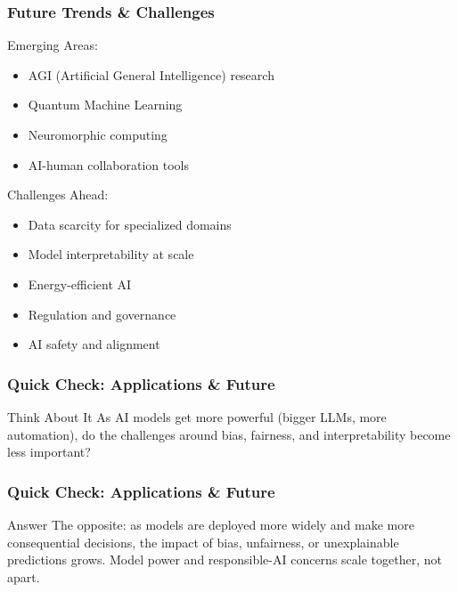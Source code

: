 \begin{frame}[fragile]\frametitle{Future Trends \& Challenges}
Emerging Areas:
\begin{itemize}
\item AGI (Artificial General Intelligence) research
\item Quantum Machine Learning
\item Neuromorphic computing
\item  AI-human collaboration tools
\end{itemize}

Challenges Ahead:
\begin{itemize}
\item Data scarcity for specialized domains
\item Model interpretability at scale
\item Energy-efficient AI
\item Regulation and governance
\item AI safety and alignment
\end{itemize}
\end{frame}

\begin{frame}[fragile]\frametitle{Quick Check: Applications \& Future}
\begin{block}{Think About It}
As AI models get more powerful (bigger LLMs, more automation), do the challenges around bias, fairness, and interpretability become less important?
\end{block}
\end{frame}

\begin{frame}[fragile]\frametitle{Quick Check: Applications \& Future}
\begin{block}{Answer}
The opposite: as models are deployed more widely and make more consequential decisions, the impact of bias, unfairness, or unexplainable predictions grows. Model power and responsible-AI concerns scale together, not apart.
\end{block}
\end{frame}

